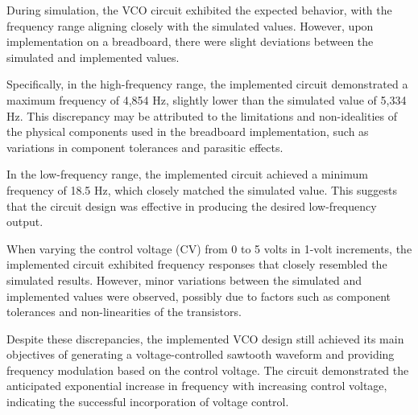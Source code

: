 \documentclass{article}
\begin{document}
During simulation, the VCO circuit exhibited the expected behavior, with the frequency range aligning closely with the simulated values. However, upon implementation on a breadboard, there were slight deviations between the simulated and implemented values.

Specifically, in the high-frequency range, the implemented circuit demonstrated a maximum frequency of 4,854 Hz, slightly lower than the simulated value of 5,334 Hz. This discrepancy may be attributed to the limitations and non-idealities of the physical components used in the breadboard implementation, such as variations in component tolerances and parasitic effects.

In the low-frequency range, the implemented circuit achieved a minimum frequency of 18.5 Hz, which closely matched the simulated value. This suggests that the circuit design was effective in producing the desired low-frequency output.

When varying the control voltage (CV) from 0 to 5 volts in 1-volt increments, the implemented circuit exhibited frequency responses that closely resembled the simulated results. However, minor variations between the simulated and implemented values were observed, possibly due to factors such as component tolerances and non-linearities of the transistors.

Despite these discrepancies, the implemented VCO design still achieved its main objectives of generating a voltage-controlled sawtooth waveform and providing frequency modulation based on the control voltage. The circuit demonstrated the anticipated exponential increase in frequency with increasing control voltage, indicating the successful incorporation of voltage control.
\end{document}
